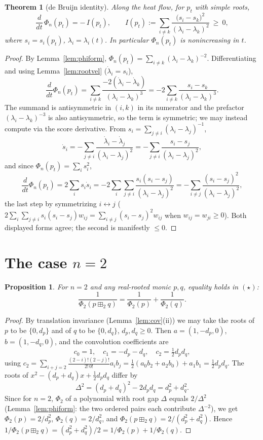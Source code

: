 \documentclass[12pt]{article}
\newtheorem{theorem}{Theorem}
\newtheorem{proposition}{Proposition}
\theoremstyle{remark}
\begin{document}
\begin{theorem}[de Bruijn identity]\label{thm:debruijn}
Along the heat flow, for $p_t$ with simple roots,
\[
\frac{d}{dt}\,\Phi_n(p_t)
=-\,I(p_t),\qquad
I(p_t):=\sum_{i\neq k}\frac{\big(s_i-s_k\big)^2}{(\lambda_i-\lambda_k)^2}\ \ge\ 0,
\]
where $s_i=s_i(p_t)$, $\lambda_i=\lambda_i(t)$.  In particular $\Phi_n(p_t)$ is
nonincreasing in $t$.
\end{theorem}

\begin{proof}
By Lemma~\ref{lem:phiform},
$\Phi_n(p_t)=\sum_{i\neq k}(\lambda_i-\lambda_k)^{-2}$.  Differentiating and
using Lemma~\ref{lem:rootvel} ($\dot\lambda_i=s_i$),
\[
\frac{d}{dt}\Phi_n(p_t)
=\sum_{i\neq k}\frac{-2(\dot\lambda_i-\dot\lambda_k)}{(\lambda_i-\lambda_k)^3}
=-2\sum_{i\neq k}\frac{s_i-s_k}{(\lambda_i-\lambda_k)^3}.
\]
The summand is antisymmetric in $(i,k)$ in its numerator and the prefactor
$(\lambda_i-\lambda_k)^{-3}$ is also antisymmetric, so the term is symmetric;
we may instead compute via the score derivative.  From
$s_i=\sum_{j\neq i}(\lambda_i-\lambda_j)^{-1}$,
\[
\dot s_i=-\sum_{j\neq i}\frac{\dot\lambda_i-\dot\lambda_j}{(\lambda_i-\lambda_j)^2}
=-\sum_{j\neq i}\frac{s_i-s_j}{(\lambda_i-\lambda_j)^2},
\]
and since $\Phi_n(p_t)=\sum_i s_i^2$,
\[
\frac{d}{dt}\Phi_n(p_t)=2\sum_i s_i\dot s_i
=-2\sum_{i}\sum_{j\neq i}\frac{s_i(s_i-s_j)}{(\lambda_i-\lambda_j)^2}
=-\sum_{i\neq j}\frac{(s_i-s_j)^2}{(\lambda_i-\lambda_j)^2},
\]
the last step by symmetrizing $i\leftrightarrow j$
($2\sum_i\sum_{j\ne i}s_i(s_i-s_j)w_{ij}
=\sum_{i\ne j}(s_i-s_j)^2 w_{ij}$ when $w_{ij}=w_{ji}\ge0$).
Both displayed forms agree; the second is manifestly $\le0$.
\end{proof}

\section{The case $n=2$}\label{sec:n2}

\begin{proposition}\label{prop:n2}
For $n=2$ and any real-rooted monic $p,q$, equality holds in $(\star)$:
\[
\frac{1}{\Phi_2(p\boxplus_2 q)}=\frac{1}{\Phi_2(p)}+\frac{1}{\Phi_2(q)} .
\]
\end{proposition}

\begin{proof}
By translation invariance (Lemma~\ref{lem:cov}(ii)) we may take the roots of
$p$ to be $\{0,d_p\}$ and of $q$ to be $\{0,d_q\}$, $d_p,d_q\ge0$.  Then
$a=(1,-d_p,0)$, $b=(1,-d_q,0)$, and the convolution coefficients are
\[
c_0=1,\quad c_1=-d_p-d_q,\quad c_2=\tfrac12 d_pd_q,
\]
using $c_2=\sum_{i+j=2}\frac{(2-i)!(2-j)!}{2!\,0!}a_ib_j
=\tfrac{1}{2}(a_0b_2+a_2b_0)+a_1b_1=\tfrac12 d_pd_q$.  The roots of
$x^2-(d_p+d_q)x+\tfrac12 d_pd_q$ differ by
\[
\Delta^2=(d_p+d_q)^2-2d_pd_q=d_p^2+d_q^2 .
\]
Since for $n=2$, $\Phi_2$ of a polynomial with root gap $\Delta$ equals
$2/\Delta^2$ (Lemma~\ref{lem:phiform}: the two ordered pairs each contribute
$\Delta^{-2}$), we get
$\Phi_2(p)=2/d_p^2$, $\Phi_2(q)=2/d_q^2$, and
$\Phi_2(p\boxplus_2 q)=2/(d_p^2+d_q^2)$.  Hence
$1/\Phi_2(p\boxplus_2q)=(d_p^2+d_q^2)/2=1/\Phi_2(p)+1/\Phi_2(q)$.
\end{proof}
\end{document}
